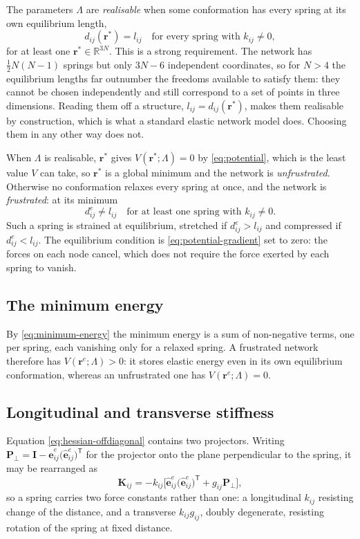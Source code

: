 \documentclass[11pt]{article}
\newcommand{\rr}{\mathbf{r}}
\newcommand{\ee}{\hat{\mathbf{e}}}
\newcommand{\KK}{\mathbf{K}}
\newcommand{\LL}{\Lambda}
\newcommand{\re}{\rr^{e}}
\newcommand{\eeije}{\ee^{e}_{ij}}
\newcommand{\dije}{d^{e}_{ij}}
\newcommand{\gij}{g_{ij}}
\newcommand{\lij}{l_{ij}}
\newcommand{\kij}{k_{ij}}
\newcommand{\dij}{d_{ij}}
\begin{document}
The parameters $\LL$ are \emph{realisable} when some conformation has every spring at its own equilibrium length,
\begin{equation}
\dij(\rr^{\ast}) = \lij \quad \text{for every spring with } \kij \ne 0 ,
\label{eq:realisable}
\end{equation}
for at least one $\rr^{\ast} \in \mathbb{R}^{3N}$.
This is a strong requirement.
The network has $\tfrac12 N(N-1)$ springs but only $3N-6$ independent coordinates, so for $N > 4$ the equilibrium lengths far outnumber the freedoms available to satisfy them: they cannot be chosen independently and still correspond to a set of points in three dimensions.
Reading them off a structure, $\lij = \dij(\rr^{\ast})$, makes them realisable by construction, which is what a standard elastic network model does.
Choosing them in any other way does not.

When $\LL$ is realisable, $\rr^{\ast}$ gives $V(\rr^{\ast};\LL) = 0$ by \eqref{eq:potential}, which is the least value $V$ can take, so $\rr^{\ast}$ is a global minimum and the network is \emph{unfrustrated}.
Otherwise no conformation relaxes every spring at once, and the network is \emph{frustrated}: at its minimum
\begin{equation}
\dije \ne \lij \quad \text{for at least one spring with } \kij \ne 0 .
\label{eq:frustration}
\end{equation}
Such a spring is strained at equilibrium, stretched if $\dije > \lij$ and compressed if $\dije < \lij$.
The equilibrium condition is \eqref{eq:potential-gradient} set to zero: the forces on each node cancel, which does not require the force exerted by each spring to vanish.

\subsection*{The minimum energy}

By \eqref{eq:minimum-energy} the minimum energy is a sum of non-negative terms, one per spring, each vanishing only for a relaxed spring.
A frustrated network therefore has $V(\re;\LL) > 0$: it stores elastic energy even in its own equilibrium conformation, whereas an unfrustrated one has $V(\re;\LL) = 0$.

\subsection*{Longitudinal and transverse stiffness}

Equation \eqref{eq:hessian-offdiagonal} contains two projectors. Writing
$\mathbf{P}_\perp = \mathbf{I} - \eeije\big(\eeije\big)^{\mathsf T}$ for the projector
onto the plane perpendicular to the spring, it may be rearranged as
\begin{equation}
\KK_{ij} = -\kij\Big[\eeije\big(\eeije\big)^{\mathsf T}
+ \gij\mathbf{P}_\perp\Big],
\label{eq:hessian-longitudinal-transverse}
\end{equation}
so a spring carries two force constants rather than one: a longitudinal $\kij$
resisting change of the distance, and a transverse $\kij \gij$, doubly
degenerate, resisting rotation of the spring at fixed distance.
\end{document}
